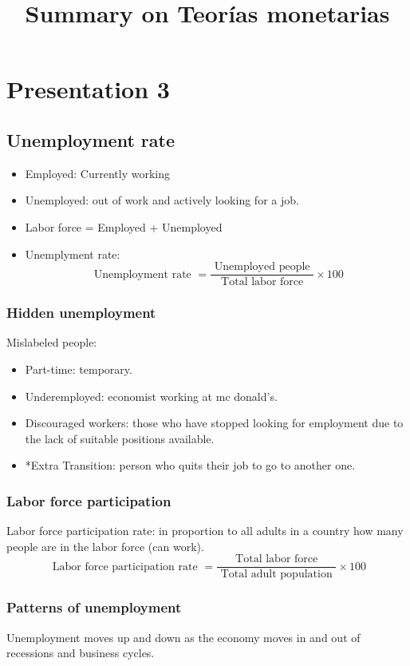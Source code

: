 \documentclass[openany]{book}
\title{Summary on Teorías monetarias}
\begin{document}


\chapter{Presentation 3}
\section{Unemployment rate}
\begin{itemize}
    \item Employed: Currently working 
    \item Unemployed: out of work and actively looking for a job.
    \item Labor force = Employed + Unemployed 
    \item Unemplyment rate: 
        \[
          \text{ Unemployment rate } = \frac{\text{ Unemployed people }}{\text{ Total labor force }} \times 100 
        \]
\end{itemize}

\subsection{Hidden unemployment}
Mislabeled people: 
\begin{itemize}
    \item Part-time: temporary.
    \item Underemployed: economist working at mc donald's.
    \item Discouraged workers: those who have stopped looking for employment due to the lack of suitable positions available.
    \item *Extra Transition: person who quits their job to go to another one. 
\end{itemize}

\subsection{Labor force participation}
Labor force participation rate: in proportion to all adults in a country how many people are in the labor force (can work). 
\[
  \text{ Labor force participation rate } = \frac{\text{ Total labor force }}{\text{ Total adult population }} \times 100
\]

\subsection{Patterns of unemployment}
Unemployment moves up and down as the economy moves in and out of recessions and business cycles.
\end{document}
